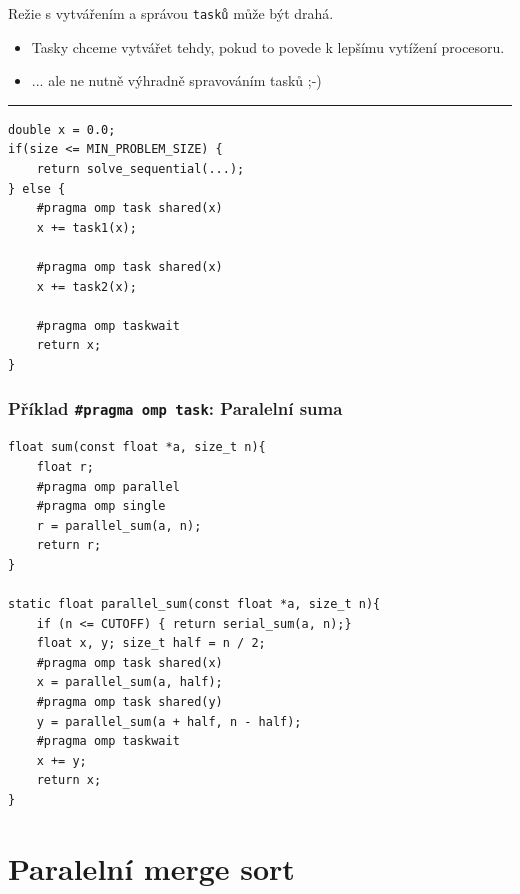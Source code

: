 \documentclass[usenames,dvipsnames,9pt]{beamer}
\begin{document}
\begin{frame}[fragile]
	\begin{center}
		\Large\faWarning \hspace{2pt} Režie s vytvářením a správou \texttt{tasků} může být drahá. \\
	\end{center}
	\begin{itemize}
		\item Tasky chceme vytvářet tehdy, pokud to povede k lepšímu vytížení procesoru.
		\item ... ale ne nutně výhradně spravováním tasků ;-)
	\end{itemize}

	\vspace{1em}\hrule\vspace{1em}

	\begin{verbatim}
double x = 0.0;
if(size <= MIN_PROBLEM_SIZE) {
	return solve_sequential(...);
} else {
	#pragma omp task shared(x)
	x += task1(x);

	#pragma omp task shared(x)
	x += task2(x);

	#pragma omp taskwait
	return x;
}
 	\end{verbatim}
\end{frame}

\begin{frame}[fragile]
\frametitle{Příklad \texttt{\#pragma omp task}: Paralelní suma}

\begin{verbatim}
float sum(const float *a, size_t n){
    float r;
    #pragma omp parallel
    #pragma omp single
    r = parallel_sum(a, n);
    return r;
}

static float parallel_sum(const float *a, size_t n){
    if (n <= CUTOFF) { return serial_sum(a, n);}
    float x, y;	size_t half = n / 2;
    #pragma omp task shared(x)
    x = parallel_sum(a, half);
    #pragma omp task shared(y)
    y = parallel_sum(a + half, n - half);
    #pragma omp taskwait
    x += y;
    return x;
}
  \end{verbatim}
  
\end{frame}

\section{Paralelní merge sort}
\end{document}
